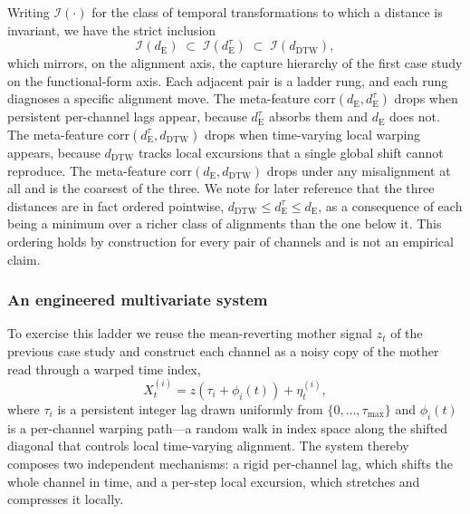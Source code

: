 \documentclass{article}
\theoremstyle{plain}
\theoremstyle{definition}
\theoremstyle{remark}
\begin{document}
Writing $\mathcal{I}(\cdot)$ for the class of temporal transformations to which a distance is invariant, we have the strict inclusion
\begin{equation*}
\mathcal{I}(d_{\mathrm{E}}) \;\subset\; \mathcal{I}(d_{\mathrm{E}}^{\tau}) \;\subset\; \mathcal{I}(d_{\mathrm{DTW}}),
\end{equation*}
which mirrors, on the alignment axis, the capture hierarchy of the first case study on the functional-form axis. Each adjacent pair is a ladder rung, and each rung diagnoses a specific alignment move. The meta-feature $\mathrm{corr}(d_{\mathrm{E}}, d_{\mathrm{E}}^{\tau})$ drops when persistent per-channel lags appear, because $d_{\mathrm{E}}^{\tau}$ absorbs them and $d_{\mathrm{E}}$ does not. The meta-feature $\mathrm{corr}(d_{\mathrm{E}}^{\tau}, d_{\mathrm{DTW}})$ drops when time-varying local warping appears, because $d_{\mathrm{DTW}}$ tracks local excursions that a single global shift cannot reproduce. The meta-feature $\mathrm{corr}(d_{\mathrm{E}}, d_{\mathrm{DTW}})$ drops under any misalignment at all and is the coarsest of the three. We note for later reference that the three distances are in fact ordered pointwise, $d_{\mathrm{DTW}} \leq d_{\mathrm{E}}^{\tau} \leq d_{\mathrm{E}}$, as a consequence of each being a minimum over a richer class of alignments than the one below it. This ordering holds by construction for every pair of channels and is not an empirical claim.

\subsubsection{An engineered multivariate system}

To exercise this ladder we reuse the mean-reverting mother signal $z_t$ of the previous case study and construct each channel as a noisy copy of the mother read through a warped time index,
\begin{equation*}
X_t^{(i)} = z\!\left(\tau_i + \phi_i(t)\right) + \eta_t^{(i)},
\end{equation*}
where $\tau_i$ is a persistent integer lag drawn uniformly from $\{0,\dots,\tau_{\max}\}$ and $\phi_i(t)$ is a per-channel warping path---a random walk in index space along the shifted diagonal that controls local time-varying alignment. The system thereby composes two independent mechanisms: a rigid per-channel lag, which shifts the whole channel in time, and a per-step local excursion, which stretches and compresses it locally.
\end{document}
